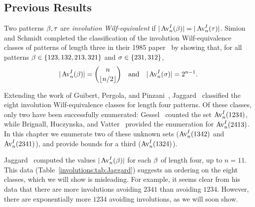   \subsection{Previous Results}

    Two patterns $\beta, \tau$ are \emph{involution Wilf-equivalent} if
    $|\operatorname{{Av}}_n^I(\beta)| = |\operatorname{{Av}}_n^I(\tau)|$. 
    Simion and Schmidt completed the classification of the involution
    Wilf-equivalence classes of patterns of length three in their 1985
    paper~\cite{Simion1985} by showing that, for all patterns $\beta \in
    \{123,132,213,321\}$ and $\sigma \in \{231, 312\}$,  
    $$ | \operatorname{{Av}}_n^I(\beta)| = \binom{n}{\left\lfloor n/2 \right\rfloor} \quad 
          \text{and} \quad |\operatorname{{Av}}_n^I(\sigma) | = 2^{n-1}.$$

    Extending the work of Guibert, Pergola, and Pinzani~\cite{Guibert2001},
    Jaggard~\cite{Jaggard2002} classified the eight involution Wilf-equivalence
    classes for length four patterns.  Of these classes, only two have been
    successfully enumerated: Gessel~\cite{Gessel1990} counted the set
    $\operatorname{{Av}}_n^I(1234)$, while Brignall, Huczynska, and Vatter~\cite{Brignall2008}
    provided the enumeration for $\operatorname{{Av}}_n^I(2413)$. In this chapter we enumerate two
    of these unknown sets ($\operatorname{{Av}}_n^I(1342)$ and $\operatorname{{Av}}_n^I(2341)$), and provide bounds
    for a third ($\operatorname{{Av}}_n^I(1324)$). 

    Jaggard~\cite{Jaggard2002} computed the values $|\operatorname{{Av}}_n^I(\beta)|$ for each $\beta$
    of length four, up to $n=11$. This data (Table~\ref{involutions:tab:Jaggard})
    suggests an ordering on the eight classes, which we will show is misleading.
    For example, it seems clear from his data that there are more involutions
    avoiding $2341$ than avoiding $1234$. However, there are exponentially more $1234$
    avoiding involutions, as we will soon show. 

